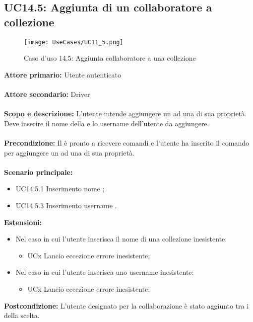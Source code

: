 \documentclass{scalatekids-article}
\begin{document}
\subsection{UC14.5: Aggiunta di un collaboratore a collezione}
\begin{figure}[H]
  \begin{center}
    \texttt{[image: UseCases/UC11\_5.png]}
    \caption*{Caso d'uso 14.5: Aggiunta collaboratore a una collezione}
  \end{center}
\end{figure}
\textbf{Attore primario:} Utente autenticato\\ \\
\textbf{Attore secondario:} Driver\\ \\
\textbf{Scopo e descrizione:} L'utente intende aggiungere un  ad una  di sua proprietà. Deve inserire il nome della  e lo username dell'utente da aggiungere.\\ \\
\textbf{Precondizione:} Il  è pronto a ricevere comandi e l'utente ha inserito il comando per aggiungere un  ad una  di sua proprietà.\\ \\
\textbf{Scenario principale:}
\begin{itemize}
\item UC14.5.1 Inserimento nome ;
\item UC14.5.3 Inserimento username .
\end{itemize}
\textbf{Estensioni:}
\begin{itemize}
  \item Nel caso in cui l'utente inserisca il nome di una collezione inesistente:
  \begin{itemize}
    \item UCx Lancio eccezione errore  inesistente;
  \end{itemize}
  \item Nel caso in cui l'utente inserisca uno username inesistente:
  \begin{itemize}
    \item UCx Lancio eccezione errore  inesistente;
  \end{itemize}
\end{itemize}
\textbf{Postcondizione:} L'utente designato per la collaborazione è stato aggiunto tra i  della  scelta.
\end{document}
